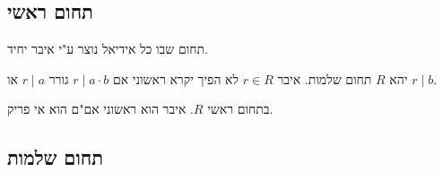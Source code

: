 \documentclass{tstextbook}
\begin{document}
\subsection{תחום ראשי}

\begin{definition}
תחום שבו כל אידיאל נוצר ע"י איבר יחיד.

\end{definition}
\begin{definition}
יהא \(R\) תחום שלמות. איבר \(r\in R\) לא הפיך יקרא ראשוני אם \(r \mid a\cdot b\) גורר \(r \mid a\) או \(r \mid b\).

\end{definition}
\begin{proposition}
בתחום ראשי \(R\). איבר הוא ראשוני אם"ם הוא אי פריק. 

\end{proposition}
\subsection{תחום שלמות}
\end{document}
